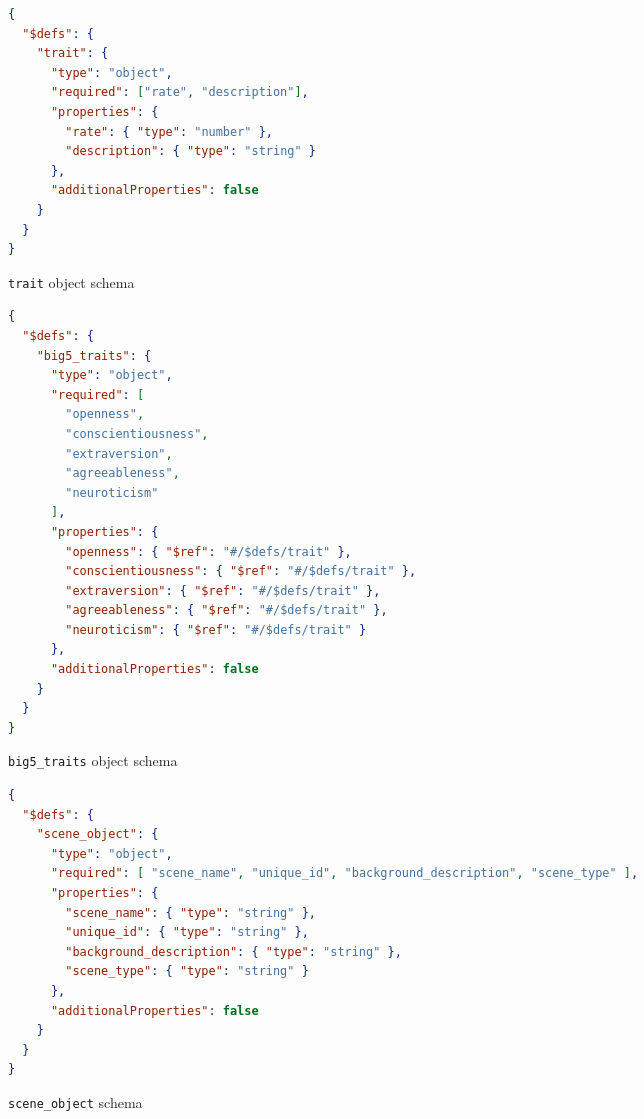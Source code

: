 \begin{figure}[!ht]
\centering
\small
\begin{minipage}{0.95\textwidth}
\begin{lstlisting}[language=json]
{
  "$defs": {
    "trait": {
      "type": "object",
      "required": ["rate", "description"],
      "properties": {
        "rate": { "type": "number" },
        "description": { "type": "string" }
      },
      "additionalProperties": false
    }
  }
}
\end{lstlisting}
\caption{\texttt{trait} object schema}
\label{fig:trait-schema}
\end{minipage}

\begin{minipage}{0.95\textwidth}
\begin{lstlisting}[language=json]
{
  "$defs": {
    "big5_traits": {
      "type": "object",
      "required": [
        "openness",
        "conscientiousness",
        "extraversion",
        "agreeableness",
        "neuroticism"
      ],
      "properties": {
        "openness": { "$ref": "#/$defs/trait" },
        "conscientiousness": { "$ref": "#/$defs/trait" },
        "extraversion": { "$ref": "#/$defs/trait" },
        "agreeableness": { "$ref": "#/$defs/trait" },
        "neuroticism": { "$ref": "#/$defs/trait" }
      },
      "additionalProperties": false
    }
  }
}
\end{lstlisting}
\caption{\texttt{big5\_traits} object schema}
\label{fig:big5-schema}
\end{minipage}

\begin{minipage}{0.95\textwidth}
\begin{lstlisting}[language=json]
{
  "$defs": {
    "scene_object": {
      "type": "object",
      "required": [ "scene_name", "unique_id", "background_description", "scene_type" ],
      "properties": {
        "scene_name": { "type": "string" },
        "unique_id": { "type": "string" },
        "background_description": { "type": "string" },
        "scene_type": { "type": "string" }
      },
      "additionalProperties": false
    }
  }
}
\end{lstlisting}
\caption{\texttt{scene\_object} schema}
\label{fig:scene-schema}
\end{minipage}
\end{figure}

